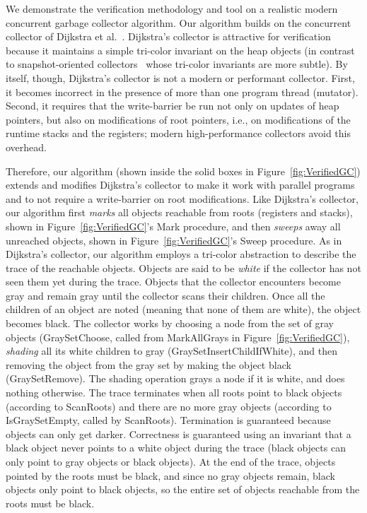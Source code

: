 We demonstrate the verification methodology and tool on a realistic modern concurrent garbage collector algorithm.
Our algorithm builds on the concurrent collector of Dijkstra et al.~\cite{dijk78}.
Dijkstra's collector is attractive for verification because it maintains a simple tri-color invariant
on the heap objects (in contrast to snapshot-oriented collectors~\cite{doli93,doli94,doma00,azat03}
whose tri-color invariants are more subtle).
By itself, though, Dijkstra's collector is not a modern or performant collector.
First, it becomes incorrect in the presence of more than one program thread (mutator).
Second, it requires that the write-barrier be run not only on updates of heap pointers,
but also on modifications of root pointers, i.e., on modifications of the runtime stacks and the registers;
modern high-performance collectors avoid this overhead.

Therefore, our algorithm (shown inside the solid boxes in Figure~\ref{fig:VerifiedGC}) extends and modifies Dijkstra's collector
to make it work with parallel programs and to not require a write-barrier on root modifications.
Like Dijkstra's collector, our algorithm first {\em marks} all objects reachable from roots (registers and stacks),
shown in Figure~\ref{fig:VerifiedGC}'s Mark procedure, and then {\em sweeps} away all unreached objects,
shown in Figure~\ref{fig:VerifiedGC}'s Sweep procedure.
As in Dijkstra's collector, our algorithm employs a tri-color abstraction to describe the trace of the reachable objects.
Objects are said to be {\em white} if the collector has not seen them yet during the trace.
Objects that the collector encounters become gray and remain gray until the collector scans their children.
Once all the children of an object are noted (meaning that none of them are white), the object becomes black.
The collector works by choosing a node from the set of gray objects (GraySetChoose, called from MarkAllGrays in Figure~\ref{fig:VerifiedGC}),
{\em shading} all its white children to gray (GraySetInsertChildIfWhite), and then removing the object from the gray set by making the object black (GraySetRemove).
The shading operation grays a node if it is white, and does nothing otherwise.
The trace terminates when all roots point to black objects (according to ScanRoots)
and there are no more gray objects (according to IsGraySetEmpty, called by ScanRoots).
Termination is guaranteed because objects can only get darker.
Correctness is guaranteed using an invariant that a black object never points to a white object during the trace
(black objects can only point to gray objects or black objects).
At the end of the trace, objects pointed by the roots must be black, and since no gray objects remain,
black objects only point to black objects,
so the entire set of objects reachable from the roots must be black.

